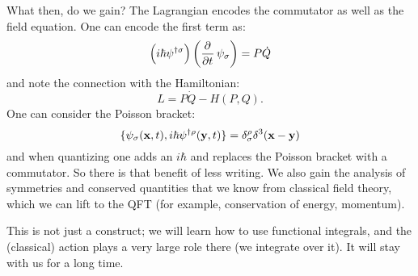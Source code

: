 What then, do we gain? The Lagrangian encodes the commutator as well as the field equation. One can encode the first term as:
\begin{equation}
    \left(i\hbar \psi^{\dag\sigma}\right)\left(\dpd{}{t}\psi_\sigma\right) = P\dot{Q}
\end{equation}
and note the connection with the Hamiltonian:
\begin{equation}
    L = P\dot{Q} - H(P, Q).
\end{equation}
One can consider the Poisson bracket:
\begin{equation}
    \{\psi_\sigma(\mathbf{x}, t), i\hbar\psi^{\dagger\rho}(\mathbf{y}, t)\} = \delta_\sigma^\rho\delta^3(\mathbf{x} - \mathbf{y})
\end{equation}
and when quantizing one adds an $i\hbar$ and replaces the Poisson bracket with a commutator. So there is that benefit of less writing. We also gain the analysis of symmetries and conserved quantities that we know from classical field theory, which we can lift to the QFT (for example, conservation of energy, momentum).

This is not just a construct; we will learn how to use functional integrals, and the (classical) action plays a very large role there (we integrate over it). It will stay with us for a long time.